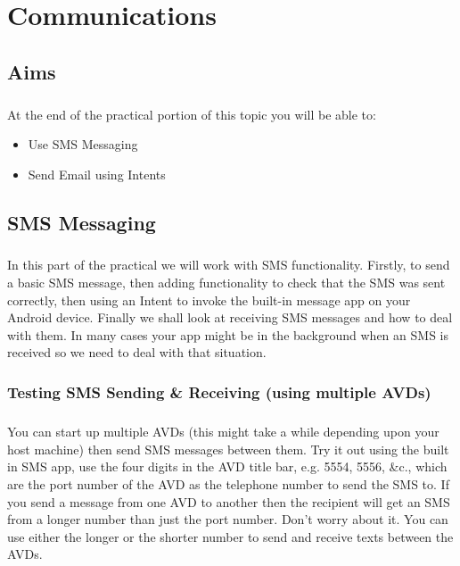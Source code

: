 \chapter{Communications}
\section{Aims}
\paragraph{} At the end of the practical portion of this topic you will be able to:

\begin{itemize}
\item Use SMS Messaging
\item Send Email using Intents
\end{itemize}

\section{SMS Messaging}
\paragraph{} In this part of the practical we will work with SMS functionality. Firstly, to send a basic SMS message, then adding functionality to check that the SMS was sent correctly, then using an Intent to invoke the built-in message app on your Android device. Finally we shall look at receiving SMS messages and how to deal with them. In many cases your app might be in the background when an SMS is received so we need to deal with that situation.


\subsection{Testing SMS Sending \& Receiving (using multiple AVDs)}
\paragraph{} You can start up multiple AVDs (this might take a while depending upon your host machine) then send SMS messages between them. Try it out using the built in SMS app, use the four digits in the AVD title bar, e.g. 5554, 5556, \&c., which are the port number of the AVD as the telephone number to send the SMS to. If you send a message from one AVD to another then the recipient will get an SMS from a longer number than just the port number. Don't worry about it. You can use either the longer or the shorter number to send and receive texts between the AVDs.

